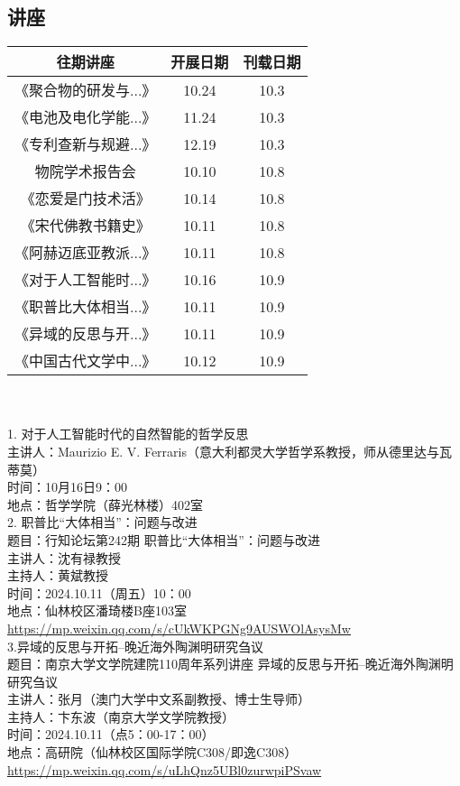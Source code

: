 \documentclass[letterpaper, 12pt]{article}
\begin{document}
\begin{multicols}{2}
\section{讲座}
\begin{tabular}{|c|c|c|}
    \hline
    往期讲座 & 开展日期 & 刊载日期\\
    \hline\hline
    《聚合物的研发与...》 & 10.24 & 10.3\\
    《电池及电化学能...》 & 11.24 & 10.3\\
    《专利查新与规避...》 & 12.19 & 10.3\\
    物院学术报告会 & 10.10 & 10.8\\
    《恋爱是门技术活》 & 10.14 & 10.8\\
    《宋代佛教书籍史》 & 10.11 & 10.8\\
    《阿赫迈底亚教派...》 & 10.11 & 10.8\\
    《对于人工智能时...》 & 10.16 & 10.9\\
    《职普比大体相当...》 & 10.11 & 10.9\\
    《异域的反思与开...》 & 10.11 & 10.9\\
    《中国古代文学中...》 & 10.12 & 10.9\\
      \hline
\end{tabular}\\\\
1. 对于人工智能时代的自然智能的哲学反思\\
主讲人：Maurizio E. V. Ferraris（意大利都灵大学哲学系教授，师从德里达与瓦蒂莫）\\
时间：10月16日9：00\\
地点：哲学学院（薛光林楼）402室\\

2. 职普比“大体相当”：问题与改进\\
题目：行知论坛第242期 职普比“大体相当”：问题与改进\\
主讲人：沈有禄教授\\
主持人：黄斌教授\\
时间：2024.10.11（周五）10：00\\
地点：仙林校区潘琦楼B座103室\\
\url{https://mp.weixin.qq.com/s/cUkWKPGNg9AUSWOlAsysMw}\\

3.异域的反思与开拓--晚近海外陶渊明研究刍议\\
题目：南京大学文学院建院110周年系列讲座 异域的反思与开拓--晚近海外陶渊明研究刍议\\
主讲人：张月（澳门大学中文系副教授、博士生导师）\\
主持人：卞东波（南京大学文学院教授）\\
时间：2024.10.11（点5：00-17：00）\\
地点：高研院（仙林校区国际学院C308/即逸C308）\\
\url{https://mp.weixin.qq.com/s/uLhQnz5UBl0zurwpiPSvaw}\\


\end{multicols}
\end{document}
